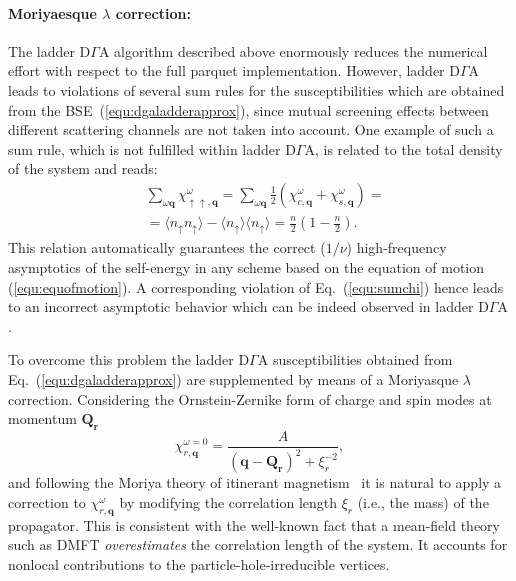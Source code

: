 \documentclass[rmp,aps,reprint,amsmath,amssymb,superscriptaddress,showpacs,nofootinbib]{revtex4-1}
\begin{document}
\paragraph*{Moriyaesque \texorpdfstring{$\lambda$}{lambda} correction:}
The ladder D$\Gamma$A algorithm described above enormously reduces the numerical effort with respect to the full parquet implementation. However,  ladder D$\Gamma$A leads to violations of several sum rules for the susceptibilities which are obtained from the BSE~(\ref{equ:dgaladderapprox}), since mutual screening effects between different scattering channels are not taken into account. One example of such a sum rule, which is not fulfilled within ladder D$\Gamma$A, is related to the total density of the system and reads:
\begin{align}
\label{equ:sumchi}
  &\sum_{\omega\mathbf{q}}\chi_{\uparrow\uparrow,\mathbf{q}}^{\omega}=\sum_{\omega\mathbf{q}}\frac{1}{2}\left(\chi_{c,\mathbf{q}}^{\omega}+\chi_{s,\mathbf{q}}^{\omega}\right)=\nonumber\\&=\langle n_{\uparrow}n_{\uparrow}\rangle-\langle n_{\uparrow}\rangle\langle n_{\uparrow}\rangle=\frac{n}{2}\left(1-\frac{n}{2}\right).
\end{align}
This relation automatically guarantees the correct ($1/\nu$) high-frequency asymptotics of the self-energy in any scheme based on the equation of motion (\ref{equ:equofmotion}). A corresponding violation of Eq.~(\ref{equ:sumchi}) hence leads to an incorrect asymptotic behavior which can be indeed observed in ladder D$\Gamma$A \cite{Toschi2007,Katanin2009}.

To overcome this problem the ladder D$\Gamma$A susceptibilities obtained from Eq.~(\ref{equ:dgaladderapprox}) are supplemented by means of a Moriyasque $\lambda$ correction. Considering the Ornstein-Zernike form of charge and spin modes at momentum $\mathbf{Q_r}$
\begin{equation}
\label{equ:spinmode}
 \chi_{r,\mathbf{q}}^{\omega=0}=\frac{A}{\left(\mathbf{q}-\mathbf{Q_r}\right)^2+\xi_r^{-2}}, 
\end{equation}
and following the Moriya theory of itinerant magnetism~\cite{Moriya1985} it is natural to apply a correction to $\chi_{r,\mathbf{q}}^{\omega}$ by modifying the correlation length $\xi_r$ (i.e., the mass) of the propagator. This is consistent with the well-known fact that a mean-field theory such as DMFT {\sl overestimates} the correlation length of the system. It  accounts for nonlocal  contributions to the particle-hole-irreducible  vertices. 
\end{document}
